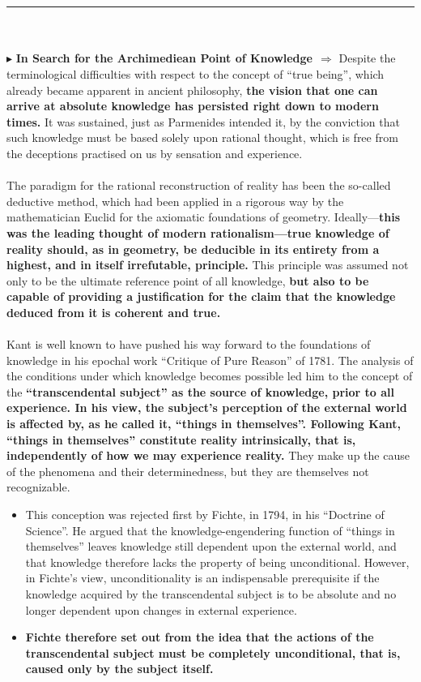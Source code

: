 \documentclass[10pt]{article}
\newcommand{\newpoint}[1]{\indent $\blacktriangleright$ \textbf{#1}$\ \ \Rightarrow$}
\newcommand{\divider}{\par\noindent\rule{\textwidth}{0.4pt}\\ \ \\}
\begin{document}
            \\
            \\
            \divider
            \newpoint{In Search for the Archimediean Point of Knowledge} Despite the terminological difficulties with respect to the concept of “true being”, which already became apparent in ancient philosophy, \textbf{the vision that one can arrive at absolute knowledge has persisted right down to modern times.} It was sustained, just as Parmenides intended it, by the conviction that such knowledge must be based solely upon rational thought, which is free from the deceptions practised on us by sensation and experience.
            \\
            \\
            The paradigm for the rational reconstruction of reality has been the so-called deductive method, which had been applied in a rigorous way by the mathematician Euclid for the axiomatic foundations of geometry. Ideally—\textbf{this was the leading thought of modern rationalism—true knowledge of reality should, as in geometry, be deducible in its entirety from a highest, and in itself irrefutable, principle.} This principle was assumed not only to be the ultimate reference point of all knowledge, \textbf{but also to be capable of providing a justification for the claim that the knowledge deduced from it is coherent and true.}
            \\
            \\
            Kant is well known to have pushed his way forward to the foundations of knowledge in his epochal work “Critique of Pure Reason” of 1781. The analysis of the conditions under which knowledge becomes possible led him to the concept of the \textbf{“transcendental subject” as the source of knowledge, prior to all experience. In his view, the subject's perception of the external world is affected by, as he called it, “things in themselves”. Following Kant, “things in themselves” constitute reality intrinsically, that is, independently of how we may experience reality.} They make up the cause of the phenomena and their determinedness, but they are themselves not recognizable.
            \begin{itemize}
                \item This conception was rejected first by Fichte, in 1794, in his “Doctrine of Science”. He argued that the knowledge-engendering function of “things in themselves” leaves knowledge still dependent upon the external world, and that knowledge therefore lacks the property of being unconditional. However, in Fichte's view, unconditionality is an indispensable prerequisite if the knowledge acquired by the transcendental subject is to be absolute and no longer dependent upon changes in external experience.
                \item \textbf{Fichte therefore set out from the idea that the actions of the transcendental subject must be completely unconditional, that is, caused only by the subject itself.}
            \end{itemize}
\end{document}
